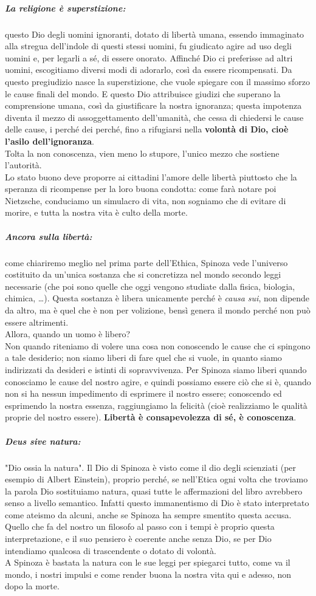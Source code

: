 \subparagraph{La religione è superstizione:}questo Dio degli uomini ignoranti, dotato di libertà umana, essendo immaginato alla stregua dell'indole di questi stessi uomini, fu giudicato agire ad uso degli uomini e, per legarli a sé, di essere onorato. Affinché Dio ci preferisse ad altri uomini, escogitiamo diversi modi di adorarlo, così da essere ricompensati. Da questo pregiudizio nasce la superstizione, che vuole spiegare con il massimo sforzo le cause finali del mondo. E questo Dio attribuisce giudizi che superano la comprensione umana, così da giustificare la nostra ignoranza; questa impotenza diventa il mezzo di assoggettamento dell'umanità, che cessa di chiedersi le cause delle cause, i perché dei perché, fino a rifugiarsi nella  \textbf{volontà di Dio, cioè l'asilo dell'ignoranza}.\\
Tolta la non conoscenza, vien meno lo stupore, l'unico mezzo che sostiene l'autorità.\\
Lo stato buono deve proporre ai cittadini l'amore delle libertà piuttosto che la speranza di ricompense per la loro buona condotta: come farà notare poi Nietzsche, conduciamo un simulacro di vita, non sogniamo che di evitare di morire, e tutta la nostra vita è culto della morte.
\subparagraph{Ancora sulla libertà:}come chiariremo meglio nel prima parte dell'Ethica, Spinoza vede l'universo costituito da un'unica sostanza che si concretizza nel mondo secondo leggi necessarie (che poi sono quelle che oggi vengono studiate dalla fisica, biologia, chimica, \dots). Questa sostanza è libera unicamente perché è \textit{causa sui}, non dipende da altro, ma è quel che è non per volizione, bensì genera il mondo perché non può essere altrimenti.\\
Allora, quando un uomo è libero?\\
Non quando riteniamo di volere una cosa non conoscendo le cause che ci spingono a tale desiderio; non siamo liberi di fare quel che si vuole, in quanto siamo indirizzati da desideri e istinti di sopravvivenza. Per Spinoza siamo liberi quando conosciamo le cause del nostro agire, e quindi possiamo essere ciò che si è, quando non si ha nessun impedimento di esprimere il nostro essere; conoscendo ed esprimendo la nostra essenza, raggiungiamo la felicità (cioè realizziamo le qualità proprie del nostro essere). \textbf{Libertà è consapevolezza di sé, è conoscenza}.
\subparagraph{Deus sive natura:}"Dio ossia la natura". Il Dio di Spinoza è visto come il dio degli scienziati (per esempio di Albert Einstein), proprio perché, se nell'Etica ogni volta che troviamo la parola Dio sostituiamo natura, quasi tutte le affermazioni del libro avrebbero senso a livello semantico. Infatti questo immanentismo di Dio è stato interpretato come ateismo da alcuni, anche se Spinoza ha sempre smentito questa accusa. Quello che fa del nostro un filosofo al passo con i tempi è proprio questa interpretazione, e il suo pensiero è coerente anche senza Dio, se per Dio intendiamo qualcosa di trascendente o dotato di volontà.\\
A Spinoza è bastata la natura con le sue leggi per spiegarci tutto, come va il mondo, i nostri impulsi e come render buona la nostra vita qui e adesso, non dopo la morte.
